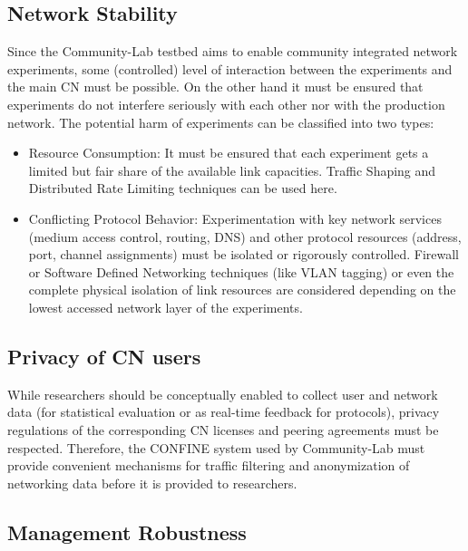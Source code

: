 \documentclass[conference]{IEEEtran}
\begin{document}
\subsection{Network Stability}
Since the Community-Lab testbed aims to enable community integrated network
experiments, some (controlled) level of interaction between the
experiments and the main CN must be possible. On the other hand it
must be ensured that experiments do not interfere seriously with each
other nor with the production network.  The potential harm of
experiments can be classified into two types:

\begin{itemize}

\item Resource Consumption: It must be ensured that each experiment
  gets a limited but fair share of the available link capacities.
  Traffic Shaping and Distributed Rate Limiting techniques can be used
  here.

\item Conflicting Protocol Behavior: Experimentation with key network
  services (medium access control, routing, DNS) and other protocol
  resources (address, port, channel assignments) must be isolated or
  rigorously controlled.  Firewall or Software Defined Networking
  techniques (like VLAN tagging) or even the complete physical
  isolation of link resources are considered depending on the lowest
  accessed network layer of the experiments.

\end{itemize}

\subsection{Privacy of CN users}

While researchers should be conceptually enabled to collect user
and network data (for statistical evaluation or as real-time feedback
for protocols), privacy regulations of the corresponding CN licenses
and peering agreements must be respected.
Therefore, the CONFINE system used by Community-Lab must provide convenient mechanisms for
traffic filtering and anonymization of networking data before it is
provided to researchers.

\subsection{Management Robustness}
\end{document}
